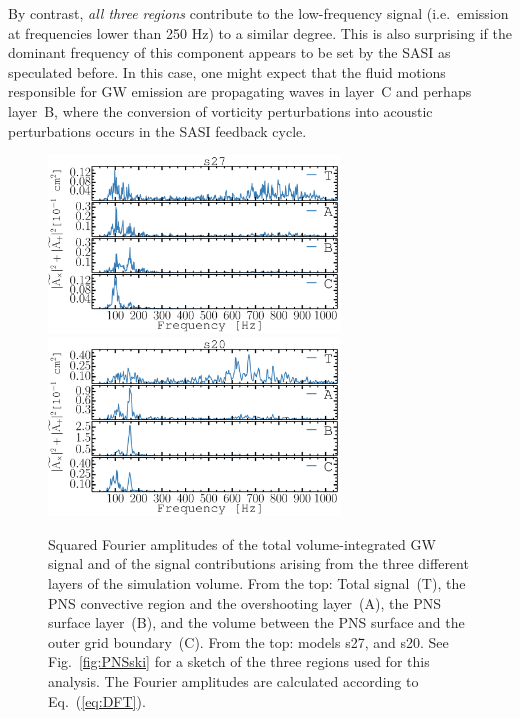 By contrast, \emph{all three regions} contribute to the low-frequency
signal (i.e.\ emission at frequencies lower than 250 Hz) to a similar degree. This is also surprising
if the dominant frequency of this component appears to be set by the SASI
as speculated before. In this case, one might expect that
the fluid motions responsible for GW emission are propagating
waves in layer~C and perhaps layer~B,
where the conversion of vorticity perturbations into acoustic
perturbations occurs in the SASI feedback cycle. 
\begin{figure}
\centering
\includegraphics[width=0.69\textwidth]{./images/paper1/fig6a.pdf}
\includegraphics[width=0.69\textwidth]{./images/paper1/fig6b.pdf} \\
\caption{Squared Fourier amplitudes of the total volume-integrated GW
  signal and of the signal contributions arising from the three different
  layers of the simulation volume.  
  From the top: Total signal~(T), 
  the PNS convective region and the overshooting layer~(A), the PNS surface layer~(B),
  and the volume between the PNS surface and the outer grid boundary~(C).  
  From the top: models s27, and s20.
  See Fig.~\ref{fig:PNSski} for a sketch of the three
  regions used for this analysis. The Fourier amplitudes are calculated according to
  Eq.~(\ref{eq:DFT}). 
\label{fig:cuts}}
\end{figure}

